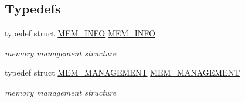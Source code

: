 \subsection*{Typedefs}
\begin{DoxyCompactItemize}
\item 
\hypertarget{group__mem_ga5aa3c5fe63142706293c0d82e915a154}{}typedef struct \hyperlink{struct_m_e_m___i_n_f_o}{M\+E\+M\+\_\+\+I\+N\+F\+O} \hyperlink{group__mem_ga5aa3c5fe63142706293c0d82e915a154}{M\+E\+M\+\_\+\+I\+N\+F\+O}\label{group__mem_ga5aa3c5fe63142706293c0d82e915a154}

\begin{DoxyCompactList}\small\item\em memory management structure \end{DoxyCompactList}\item 
\hypertarget{group__mem_gae6f093f4aef9b182a961d395b2b9a9aa}{}typedef struct \hyperlink{struct_m_e_m___m_a_n_a_g_e_m_e_n_t}{M\+E\+M\+\_\+\+M\+A\+N\+A\+G\+E\+M\+E\+N\+T} \hyperlink{group__mem_gae6f093f4aef9b182a961d395b2b9a9aa}{M\+E\+M\+\_\+\+M\+A\+N\+A\+G\+E\+M\+E\+N\+T}\label{group__mem_gae6f093f4aef9b182a961d395b2b9a9aa}

\begin{DoxyCompactList}\small\item\em memory management structure \end{DoxyCompactList}\end{DoxyCompactItemize}
